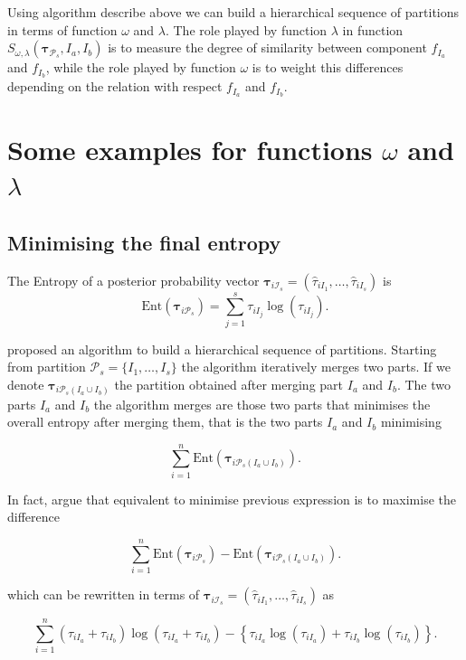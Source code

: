 \documentclass[10pt, a4paper]{article}
\newcommand{\m}[1]{\boldsymbol{#1}}
\begin{document}
\begin{spacing}{1.9}
Using algorithm describe above we can build a hierarchical sequence of partitions in terms of function $\omega$ and $\lambda$. 
The role played by function $\lambda$ in function $S_{\omega, \lambda}( \m\tau_{\mathcal{P}_s},  I_a,  I_b)$ is to measure the degree of similarity between component $f_{I_a}$ and $f_{I_b}$, while the role played by function $\omega$ is to weight this differences depending on the relation with respect $f_{I_a}$ and $f_{I_b}$.

\section{Some examples for functions $\omega$ and $\lambda$}

\subsection{Minimising the final entropy}

The Entropy of a posterior probability vector $\m\tau_{i \mathcal{I}_s} = \left( \hat{\tau}_{i I_1} , \dots, \hat{\tau}_{i I_s}  \right)$ is
\[
\text{Ent}( \m\tau_{i \mathcal{P}_s} ) = \sum_{j=1}^s \tau_{i I_j}  \log(\tau_{i I_j} ).
\]


\cite{baudry2010combining} proposed an algorithm to build a hierarchical sequence of partitions. Starting from partition $\mathcal{P}_s = \{ I_1, \dots, I_s\}$ the algorithm iteratively merges two parts. If we denote $\m\tau_{i \mathcal{P}_s(I_a\cup I_b)}$ the partition obtained after merging part $I_a$ and $I_b$. The two parts $I_a$ and $I_b$ the algorithm merges are those two parts that minimises the overall entropy after merging them, that is the two parts $I_a$ and $I_b$ minimising

\[
\sum_{i=1}^n \text{Ent}( \m\tau_{i \mathcal{P}_s(I_a\cup I_b)} ).
\]


In fact, \cite{baudry2010combining}  argue that equivalent to minimise previous expression is to maximise the difference

\[
\sum_{i=1}^n \text{Ent}( \m\tau_{i \mathcal{P}_s} ) - \text{Ent}( \m\tau_{i \mathcal{P}_s(I_a\cup I_b)} ).
\]

which can be rewritten in terms of $\m\tau_{i \mathcal{I}_s} = \left( \hat{\tau}_{i I_1} , \dots, \hat{\tau}_{i I_s}  \right)$ as

\begin{equation}\label{entropy}
\sum_{i=1}^n  (\tau_{iI_a}+\tau_{iI_b}) \log(\tau_{iI_a} + \tau_{iI_b}) - \left\{ \tau_{iI_a} \log(\tau_{iI_a}) + \tau_{iI_b} \log(\tau_{iI_b}) \right\}.
\end{equation}


\end{spacing}
\end{document}
